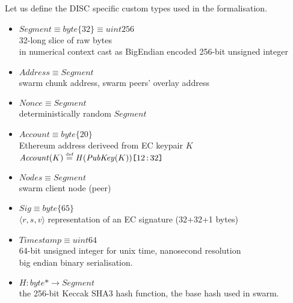 \begin{definition}
Let us define the  DISC specific custom types used in the formalisation.
\begin{itemize}[noitemsep,leftmargin=0pt]
\item[] $\mathit{Segment}\equiv\mathit{byte}\{32\}\equiv\mathit{uint256}$\\\hspace*{1em}
    32-long slice of raw bytes\\\hspace*{1em}
    in numerical context cast as BigEndian encoded 256-bit unsigned integer 
\item[]  $\mathit{Address} \equiv \mathit{Segment}$\\\hspace*{1em}
    swarm chunk address, swarm peers' overlay address
\item[] $\mathit{Nonce} \equiv \mathit{Segment}$\\\hspace*{1em}
    deterministically random $\mathit{Segment}$
\item[]$\mathit{Account}\equiv \mathit{byte}\{20\}$\\\hspace*{1em}
    Ethereum address deriveed from EC keypair $K$\\\hspace*{1em}
    $\mathit{Account}(K)\overset{\textrm{\tiny def}}{=}\mathit{H}(\mathit{PubKey}(K))\texttt{[}\/12\operatorname{:}32\/\texttt{]}$
\item[] $\mathit{Nodes} \equiv \mathit{Segment}$\\\hspace*{1em}
    swarm client node (peer)
\item[]$\mathit{Sig} \equiv \mathit{byte}\{65\}$\\\hspace*{1em}
$\langle r,s,v\rangle$ representation of an EC signature (32+32+1
bytes)
\item[] $\mathit{Timestamp}\equiv\mathit{uint64}$\\\hspace*{1em}
    64-bit unsigned integer for unix time, nanosecond resolution\\\hspace*{1em} 
    big endian binary serialisation.
\item[] $\mathit{H}:\mathit{byte}{*}\to             \mathit{Segment}$\\\hspace*{1em}
the 256-bit Keccak SHA3 hash function, the base hash used in swarm.
\end{itemize}
\end{definition}

